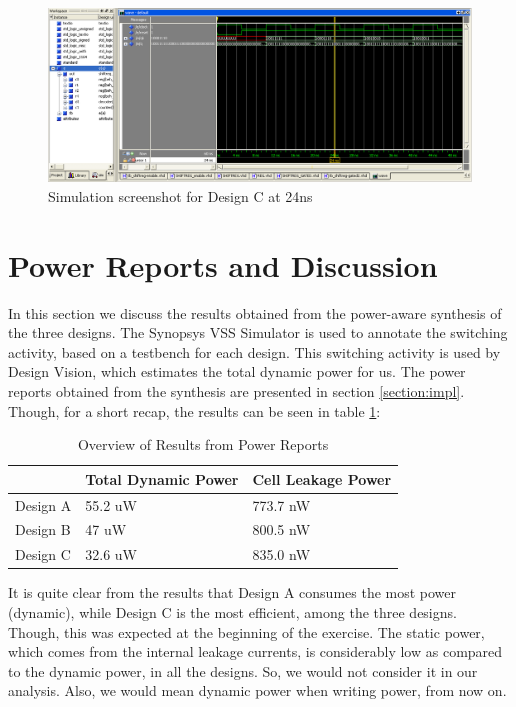 \documentclass[11pt,a4paper]{article}
\begin{document}
\begin{figure}[htp]
\centering
\includegraphics[length = 4in,width = 6.5in]{./images/simsrg2.png}
\caption{Simulation screenshot for Design C at 24ns}
\end{figure}

\newpage
\section{Power Reports and Discussion}
\label{section:power}

In this section we discuss the results obtained from the power-aware synthesis of the three designs. The Synopsys VSS Simulator is used to annotate the switching activity, based on a testbench for each design. This switching activity is used by Design Vision, which estimates the total dynamic power for us. The power reports obtained from the synthesis are presented in section \ref{section:impl}. Though, for a short recap, the results can be seen in table \ref{table:power}:

\begin{table}[htbp]
\begin{center}
\begin{tabular}{|l|l|l|}
\hline
\textbf{}	& \textbf{Total Dynamic Power}		& \textbf{Cell Leakage Power}\\ \hline
Design A &	55.2 uW				& 773.7 nW \\ \hline
Design B &	47 uW					& 800.5 nW \\ \hline
Design C &  32.6 uW				& 835.0 nW \\ \hline
\end{tabular}
\end{center}
\caption{Overview of Results from Power Reports}
\label{table:power}
\end{table}

It is quite clear from the results that Design A consumes the most power (dynamic), while Design C is the most efficient, among the three designs. Though, this was expected at the beginning of the exercise. The static power, which comes from the internal leakage currents, is considerably low as compared to the dynamic power, in all the designs. So, we would not consider it in our analysis. Also, we would mean dynamic power when writing power, from now on.
\end{document}
